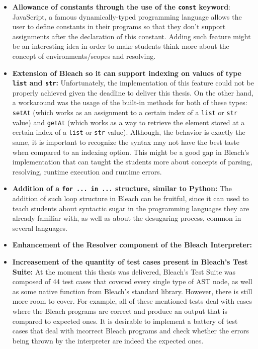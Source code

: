 \begin{itemize}
    \item \textbf{Allowance of constants through the use of the \texttt{const} keyword}: JavaScript, a famous dynamically-typed programming language allows the user to define constants in their programs so that they don't support assignments after the declaration of this constant. Adding such feature might be an interesting idea in order to make students think more about the concept of environments/scopes and resolving.

    \item \textbf{Extension of Bleach so it can support indexing on values of type \texttt{list} and \texttt{str}:} Unfortunately, the implementation of this feature could not be properly achieved given the deadline to deliver this thesis. On the other hand, a workaround was the usage of the built-in methods for both of these types: \texttt{setAt} (which works as an assignment to a certain index of a \texttt{list} or \texttt{str} value) and \texttt{getAt} (which works as a way to retrieve the element stored at a certain index of a \texttt{list} or \texttt{str} value). Although, the behavior is exactly the same, it is important to recognize the syntax may not have the best taste when compared to an indexing option. This might be a good gap in Bleach's implementation that can taught the students more about concepts of parsing, resolving, runtime execution and runtime errors.

    \item \textbf{Addition of a \texttt{for ... in ...} structure, similar to Python:} The addition of such loop structure in Bleach can be fruitful, since it can used to teach students about syntactic sugar in the programming languages they are already familiar with, as well as about the desugaring process, common in several languages.

    \item \textbf{Enhancement of the Resolver component of the Bleach Interpreter:}

    \item \textbf{Increasement of the quantity of test cases present in Bleach's Test Suite:} At the moment this thesis was delivered, Bleach's Test Suite was composed of 44 test cases that covered every single type of AST node, as well as some native function from Bleach's standard library. However, there is still more room to cover. For example, all of these mentioned tests deal with cases where the Bleach programs are correct and produce an output that is compared to expected ones. It is desirable to implement a battery of test cases that deal with incorrect Bleach programs and check whether the errors being thrown by the interpreter are indeed the expected ones.


\end{itemize}
